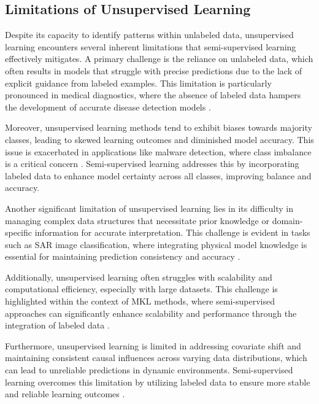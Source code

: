 \subsection{Limitations of Unsupervised Learning} \label{subsec:Limitations of Unsupervised Learning}

Despite its capacity to identify patterns within unlabeled data, unsupervised learning encounters several inherent limitations that semi-supervised learning effectively mitigates. A primary challenge is the reliance on unlabeled data, which often results in models that struggle with precise predictions due to the lack of explicit guidance from labeled examples. This limitation is particularly pronounced in medical diagnostics, where the absence of labeled data hampers the development of accurate disease detection models \cite{zolfaghari2023surveyautomateddetectionclassification}.

Moreover, unsupervised learning methods tend to exhibit biases towards majority classes, leading to skewed learning outcomes and diminished model accuracy. This issue is exacerbated in applications like malware detection, where class imbalance is a critical concern \cite{m2023comparativeanalysisimbalancedmalware}. Semi-supervised learning addresses this by incorporating labeled data to enhance model certainty across all classes, improving balance and accuracy.

Another significant limitation of unsupervised learning lies in its difficulty in managing complex data structures that necessitate prior knowledge or domain-specific information for accurate interpretation. This challenge is evident in tasks such as SAR image classification, where integrating physical model knowledge is essential for maintaining prediction consistency and accuracy \cite{huang2022physicallyexplainablecnnsar}.

Additionally, unsupervised learning often struggles with scalability and computational efficiency, especially with large datasets. This challenge is highlighted within the context of MKL methods, where semi-supervised approaches can significantly enhance scalability and performance through the integration of labeled data \cite{moeller2014geometricalgorithmscalablemultiple}.

Furthermore, unsupervised learning is limited in addressing covariate shift and maintaining consistent causal influences across varying data distributions, which can lead to unreliable predictions in dynamic environments. Semi-supervised learning overcomes this limitation by utilizing labeled data to ensure more stable and reliable learning outcomes \cite{sen2018supervisingfeatureinfluence}.

